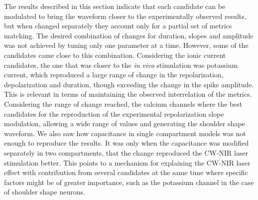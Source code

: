 The results described in this section indicate that each candidate can be modulated to bring the waveform closer to the experimentally observed results, but when changed separately they account only for a partial set of metrics matching. The desired combination of changes for duration, slopes and amplitude was not achieved by tuning only one parameter at a time. However, some of the candidates came close to this combination. Considering the ionic current candidates, the one that was closer to the \textit{in vivo} stimulation was potassium current, which reproduced a large range of change in the repolarization, depolarization and duration, though exceeding the change in the spike amplitude. This is relevant in terms of maintaining the observed interrelation of the metrics. Considering the range of change reached, the calcium channels where the best candidates for the reproduction of the experimental repolarization slope modulation, allowing a wide range of values and generating the shoulder shape waveform. We also saw how capacitance in single compartment models was not enough to reproduce the results. It was only when the capacitance was modified separately in two compartments, that the change reproduced the CW-NIR laser stimulation better. This points to a mechanism for explaining the CW-NIR laser effect with contribution from several candidates at the same time where specific factors might be of greater importance, such as the potassium channel in the case of shoulder shape neurons.

